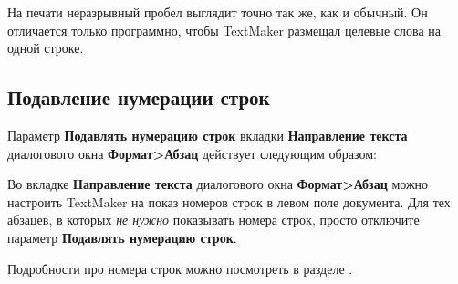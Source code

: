 ﻿\documentclass[a4paper,10pt]{article}
\begin{document}
На печати неразрывный пробел выглядит точно так же, как и обычный. Он отличается только программно, чтобы TextMaker размещал целевые слова на одной строке.

\subsection{Подавление нумерации строк}
Параметр \textbf{Подавлять нумерацию строк} вкладки \textbf{Направление текста} диалогового окна \textbf{Формат>Абзац} действует следующим образом:

Во вкладке \textbf{Направление текста} диалогового окна \textbf{Формат>Абзац} можно настроить TextMaker на показ номеров строк в левом поле документа. Для тех абзацев, в которых \textit{не нужно} показывать номера строк, просто отключите параметр \textbf{Подавлять нумерацию строк}.

Подробности про номера строк можно посмотреть в разделе .
\end{document}
